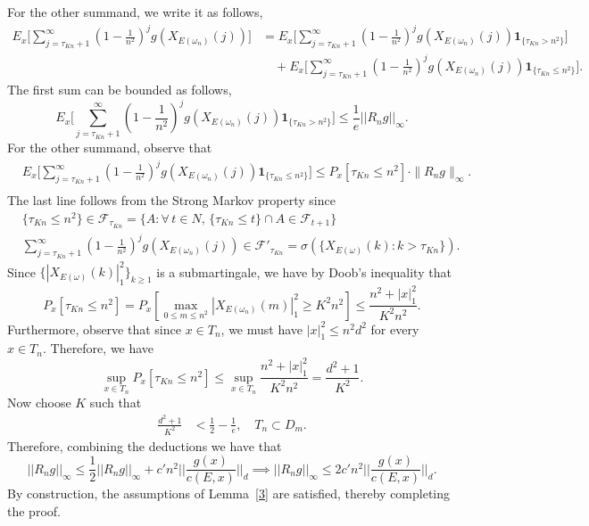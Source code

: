 \documentclass[final]{aomart}
\def\mathscr#1{#1}%
\def\mathbb#1{#1}%
\theoremstyle{plain}
\theoremstyle{definition}
\theoremstyle{remark}
\begin{document}
For the other summand, we write it as follows, 
\begin{equation*}
\begin{aligned}
\mathbb{E}_x\Bigg[
    \sum_{j=\tau_{Kn}+1}^{\infty}
    \left(1-\frac{1}{n^2}\right)^j
    g\!\left(X_{\mathscr{E}(\omega_n)}(j)\right)
\Bigg]
&=
\mathbb{E}_x\Bigg[
    \sum_{j=\tau_{Kn}+1}^{\infty}
    \left(1-\frac{1}{n^2}\right)^j
    g\!\left(X_{\mathscr{E}(\omega_n)}(j)\right)
    \mathbf{1}_{\{\tau_{Kn}>n^2\}}
\Bigg]
\\[0.4em]
&\quad +
\mathbb{E}_x\Bigg[
    \sum_{j=\tau_{Kn}+1}^{\infty}
    \left(1-\frac{1}{n^2}\right)^j
    g\!\left(X_{\mathscr{E}(\omega_n)}(j)\right)
    \mathbf{1}_{\{\tau_{Kn}\le n^2\}}
\Bigg].
\end{aligned}
\end{equation*}
The first sum can be bounded as follows, 
\[
\mathbb{E}_x\Bigg[
    \sum_{j=\tau_{Kn}+1}^{\infty}
    \left(1-\frac{1}{n^2}\right)^j
    g\!\left(X_{\mathscr{E}(\omega_n)}(j)\right)
    \mathbf{1}_{\{\tau_{Kn}>n^2\}}
\Bigg] \leq \frac{1}{e} ||R_n g||_\infty .
\]
For the other summand, observe that \begin{align*}
&\mathbb{E}_x\Bigg[
    \sum_{j=\tau_{Kn}+1}^{\infty}
    \left(1-\frac{1}{n^2}\right)^j
    g\!\left(X_{\mathscr{E}(\omega_n)}(j)\right)
    \mathbf{1}_{\{\tau_{Kn}\le n^2\}}
\Bigg] \leq \mathbb{P}_x[\tau_{Kn}\leq n^2] \cdot \|R_n g\|_\infty.\\
\end{align*}
The last line follows from the Strong Markov property since \begin{align*}
&\{\tau_{Kn} \le n^2\} \in \mathcal{F}_{\tau_{Kn}} = \{ A : \forall\, t \in \mathbb{N},\, \{\tau_{Kn} \le t\} \cap A \in \mathcal{F}_{t+1} \} \\
&\sum_{j=\tau_{Kn}+1}^{\infty} \left(1-\frac{1}{n^2}\right)^j g\!\left(X_{\mathscr{E}(\omega_n)}(j)\right) \in \mathcal{F}'_{\tau_{Kn}} = \sigma\!\left( \{ X_{\mathscr{E}(\omega)}(k) : k > \tau_{Kn} \} \right).
\end{align*}
Since $\{|X_{\mathscr{E}(\omega)}(k)|_1^2\}_{k \geq 1}$ is a submartingale, we have by Doob's inequality that \[
\mathbb{P}_x[ \tau_{Kn} \leq n^2] = \mathbb{P}_x [ \max_{0\leq m\leq n^2} |X_{{\mathscr{E}(\omega_n)}}(m)|_1^2 \geq K^2 n^2 ] \leq \frac{n^2 + |x|_1^2}{K^2 n^2}. 
\]
Furthermore, observe that since $x \in T_n$, we must have $|x|^2_1 \leq n^2 d^2$ for every $x \in T_n$. 
Therefore, we have \[
\sup_{x\in T_n} \mathbb{P}_x[ \tau_{Kn} \leq n^2]  \leq \sup_{x \in T_n} \frac{n^2 + |x|_1^2}{K^2 n^2}  = \frac{d^2 +1}{K^2}. 
\]
Now choose $K$ such that \begin{align*}
\frac{d^2 +1 }{K^2} 
&< \frac{1}{2}- \frac{1}{e},\quad T_n \subset D_m. 
\end{align*}
Therefore, combining the deductions we have that \[
||R_n g||_\infty \leq \frac{1}{2} ||R_n g||_\infty + c'n^2||\frac{g(x)}{c(\mathscr{E},x)}||_d \implies ||R_n g||_\infty \leq 2c'n^2||\frac{g(x)}{c(\mathscr{E},x)}||_d.  
\]
By construction, the assumptions of Lemma~\ref{3} are satisfied, thereby completing the proof. 
\end{document}
